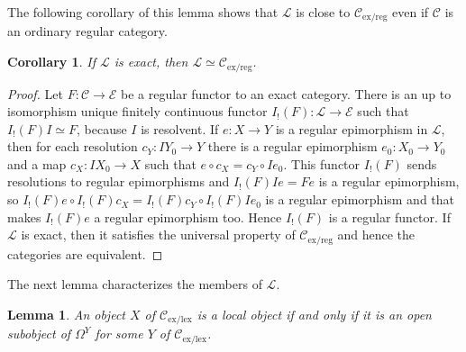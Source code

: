 \documentclass[sort&compress]{elsarticle}
\theoremstyle{plain}
\newtheorem{lemma}[theorem]{Lemma}
\newtheorem{corol}[theorem]{Corollary}
\theoremstyle{definition}
\theoremstyle{remark}
\newcommand\cat\mathcal
\newcommand\exlex{_\mathrm{ex/lex}}
\newcommand\exreg{_\mathrm{ex/reg}}
\begin{document}
The following corollary of this lemma shows that $\cat L$ is close to $\cat C\exreg$ even if $\cat C$ is an ordinary regular category.

\begin{corol} If $\cat L$ is exact, then $\cat L\simeq \cat C\exreg$. \label{LisCer}\end{corol}

\begin{proof} Let $F:\cat C\to\cat E$ be a regular functor to an exact category. There is an up to isomorphism unique finitely continuous functor $I_!(F):\cat L \to \cat E$ such that $I_!(F)I\simeq F$, because $I$ is resolvent. If $e:X\to Y$ is a regular epimorphism in $\cat L$, then for each resolution $c_Y:IY_0 \to Y$ there is a regular epimorphism $e_0:X_0 \to Y_0$ and a map $c_X: IX_0 \to X$ such that $e\circ c_X = c_Y \circ Ie_0$. This functor $I_!(F)$ sends resolutions to regular epimorphisms and $I_!(F)Ie = Fe$ is a regular epimorphism, so $I_!(F)e\circ I_!(F)c_X = I_!(F)c_Y \circ I_!(F)Ie_0$ is a regular epimorphism and that makes $I_!(F)e$ a regular epimorphism too. Hence $I_!(F)$ is a regular functor. If $\cat L$ is exact, then it satisfies the universal property of $\cat C\exreg$ and hence the categories are equivalent.
\end{proof}


The next lemma characterizes the members of $\cat L$.

\begin{lemma} An object $X$ of $\cat C\exlex$ is a local object if and only if it is an open subobject of $\Omega^Y$ for some $Y$ of $\cat C\exlex$. \label{localequiv}\end{lemma}
\end{document}
